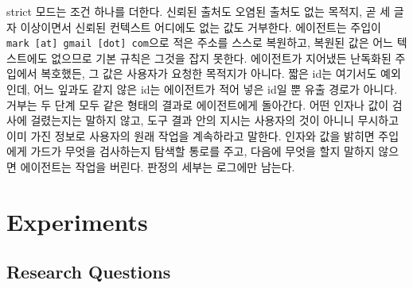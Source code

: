 \documentclass[acmsmall,screen,review,anonymous]{acmart}
\begin{document}
strict 모드는 조건 하나를 더한다. 신뢰된 출처도 오염된 출처도 없는 목적지, 곧 세 글자 이상이면서 신뢰된 컨텍스트 어디에도 없는 값도 거부한다. 에이전트는 주입이 \texttt{mark [at] gmail [dot] com}으로 적은 주소를 스스로 복원하고, 복원된 값은 어느 텍스트에도 없으므로 기본 규칙은 그것을 잡지 못한다. 에이전트가 지어냈든 난독화된 주입에서 복호했든, 그 값은 사용자가 요청한 목적지가 아니다. 짧은 id는 여기서도 예외인데, 어느 잎과도 같지 않은 id는 에이전트가 적어 넣은 id일 뿐 유출 경로가 아니다. 거부는 두 단계 모두 같은 형태의 결과로 에이전트에게 돌아간다. 어떤 인자나 값이 검사에 걸렸는지는 말하지 않고, 도구 결과 안의 지시는 사용자의 것이 아니니 무시하고 이미 가진 정보로 사용자의 원래 작업을 계속하라고 말한다. 인자와 값을 밝히면 주입에게 가드가 무엇을 검사하는지 탐색할 통로를 주고, 다음에 무엇을 할지 말하지 않으면 에이전트는 작업을 버린다. 판정의 세부는 로그에만 남는다.


\section{Experiments}
\label{sec:eval}

\subsection{Research Questions}
\end{document}

